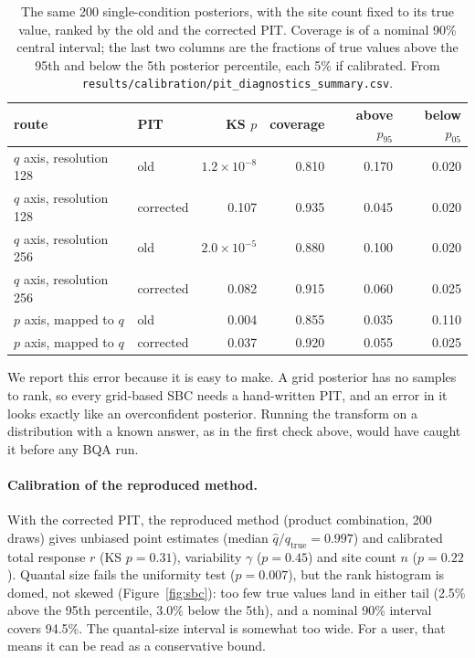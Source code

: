 \documentclass[a4paper, oneside, 10pt]{article}
\begin{document}
\begin{table}[!htb]
\centering
\caption{The same 200 single-condition posteriors, with the site count fixed to its true value, ranked by the old and the corrected PIT. Coverage is of a nominal 90\% central interval; the last two columns are the fractions of true values above the 95th and below the 5th posterior percentile, each 5\% if calibrated. From \texttt{results/calibration/pit\_diagnostics\_summary.csv}.}
\label{tab:pit}
\small
\begin{tabular}{@{}llrrrr@{}}
\toprule
route & PIT & KS \(p\) & coverage & above \(p_{95}\) & below \(p_{05}\) \\
\midrule
\(q\) axis, resolution 128 & old & \(1.2\times10^{-8}\) & 0.810 & 0.170 & 0.020 \\
\(q\) axis, resolution 128 & corrected & 0.107 & 0.935 & 0.045 & 0.020 \\
\(q\) axis, resolution 256 & old & \(2.0\times10^{-5}\) & 0.880 & 0.100 & 0.020 \\
\(q\) axis, resolution 256 & corrected & 0.082 & 0.915 & 0.060 & 0.025 \\
\(p\) axis, mapped to \(q\) & old & 0.004 & 0.855 & 0.035 & 0.110 \\
\(p\) axis, mapped to \(q\) & corrected & 0.037 & 0.920 & 0.055 & 0.025 \\
\bottomrule
\end{tabular}
\end{table}

We report this error because it is easy to make. A grid posterior has no samples to rank, so every grid-based SBC needs a hand-written PIT, and an error in it looks exactly like an overconfident posterior. Running the transform on a distribution with a known answer, as in the first check above, would have caught it before any BQA run.

\paragraph{Calibration of the reproduced method.}
With the corrected PIT, the reproduced method (product combination, 200 draws) gives unbiased point estimates (median \(\hat q/q_{\mathrm{true}} = 0.997\)) and calibrated total response \(r\) (KS \(p = 0.31\)), variability \(\gamma\) (\(p = 0.45\)) and site count \(n\) (\(p = 0.22\)). Quantal size fails the uniformity test (\(p = 0.007\)), but the rank histogram is domed, not skewed (Figure~\ref{fig:sbc}): too few true values land in either tail (2.5\% above the 95th percentile, 3.0\% below the 5th), and a nominal 90\% interval covers 94.5\%. The quantal-size interval is somewhat too wide. For a user, that means it can be read as a conservative bound.
\end{document}
